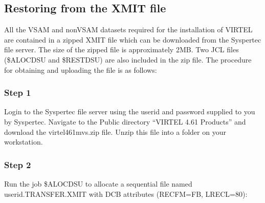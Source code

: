 \documentclass[letterpaper,10pt,english]{sphinxmanual}
\begin{document}
\ignorespaces 

\subsection{Restoring from the XMIT file}
\label{\detokenize{Installation_Guide:restoring-from-the-xmit-file}}\label{\detokenize{Installation_Guide:index-4}}
\sphinxAtStartPar
All the VSAM and non\sphinxhyphen{}VSAM datasets required for the installation of VIRTEL are contained in a zipped XMIT file which can be downloaded from the Syspertec file server. The size of the zipped file is approximately 2MB. Two JCL files (\$ALOCDSU and \$RESTDSU) are also     included in the zip file. The procedure for obtaining and uploading the file is as follows:


\subsubsection{Step 1}
\label{\detokenize{Installation_Guide:step-1}}
\sphinxAtStartPar
Login to the Syspertec file server  using the userid and password supplied to you by Syspertec. Navigate to the Public directory “VIRTEL \sphinxhyphen{} 4.61\sphinxhyphen{} Products” and download the virtel461mvs.zip file. Unzip this file into a folder on your workstation.

\newpage


\subsubsection{Step 2}
\label{\detokenize{Installation_Guide:step-2}}
\sphinxAtStartPar
Run the job \$ALOCDSU to allocate a sequential file named userid.TRANSFER.XMIT with DCB attributes (RECFM=FB, LRECL=80):
\end{document}
